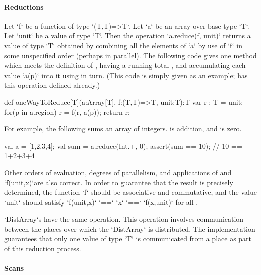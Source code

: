 \paragraph{Reductions}\label{ArrayReductions}

Let \xcd`f` be a function of type \xcd`(T,T)=>T`.  Let
\xcd`a` be an array over base type \xcd`T`.
Let \xcd`unit` be a value of type \xcd`T`.
Then the
operation \xcd`a.reduce(f, unit)` returns a value of type \xcd`T` obtained
by combining all the elements of \xcd`a` by use of  \xcd`f` in some unspecified order
(perhaps in parallel).   
The following code gives one method which 
meets the definition of ,
having a running total , and accumulating each value \xcd`a(p)` into it
using  in turn.  (This code is simply given as an example; 
has this operation defined already.)
\begin{xten}
def oneWayToReduce[T](a:Array[T], f:(T,T)=>T, unit:T):T {
  var r : T = unit;
  for(p in a.region) r = f(r, a(p));
  return r;
}
\end{xten}


For example,  the following sums an array of integers.   is addition,
and  is zero.  
\begin{xten}
val a = [1,2,3,4];
val sum = a.reduce(Int.+, 0); 
assert(sum == 10); // 10 == 1+2+3+4
\end{xten}

Other orders of evaluation, degrees of parallelism, and applications of
 and \xcd`f(unit,x)`are also correct.
In order to guarantee that the result is precisely
determined, the  function \xcd`f` should be associative and
commutative, and the value \xcd`unit` should satisfy
\xcd`f(unit,x)` \xcd`==` \xcd`x` \xcd`==` \xcd`f(x,unit)`
for all .  




\xcd`DistArray`s have the same operation.
This operation involves communication between the places over which
the \xcd`DistArray` is distributed. The \Xten{} implementation guarantees that
only one value of type \xcd`T` is communicated from a place as part of
this reduction process.

\paragraph{Scans}\label{ArrayScans}


